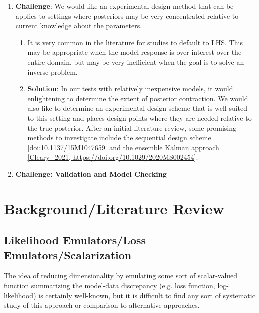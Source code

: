 \documentclass[12pt]{article}
\begin{document}
\begin{enumerate}
\begin{enumerate}
\begin{enumerate}
		\end{enumerate} 
	\end{enumerate}
\item \textbf{Challenge}: We would like an experimental design method that can be applies to settings where posteriors may be very concentrated relative to current knowledge about the parameters. 
	\begin{enumerate}
	\item It is very common in the literature for studies to default to LHS. This may be appropriate when the model response is over interest over the entire domain, but may be very inefficient 
	when the goal is to solve an inverse problem. 
	\item \textbf{Solution}: In our tests with relatively inexpensive models, it would enlightening to determine the extent of posterior contraction. We would also like to determine an experimental 
	design scheme that is well-suited to this setting and places design points where they are needed relative to the true posterior. After an initial literature review, some promising methods to 
	investigate include the sequential design scheme \ref{doi:10.1137/15M1047659} and the ensemble Kalman approach \ref{Cleary_2021, https://doi.org/10.1029/2020MS002454}. 
	\end{enumerate}
\item \textbf{Challenge: Validation and Model Checking}
\end{enumerate}



\section{Background/Literature Review}
 
 \subsection{Likelihood Emulators/Loss Emulators/Scalarization}
 The idea of reducing dimensionality by emulating some sort of scalar-valued function summarizing the model-data discrepancy (e.g. loss function, log-likelihood) is certainly well-known, but 
 it is difficult to find any sort of systematic study of this approach or comparison to alternative approaches. 
 
\end{document}
